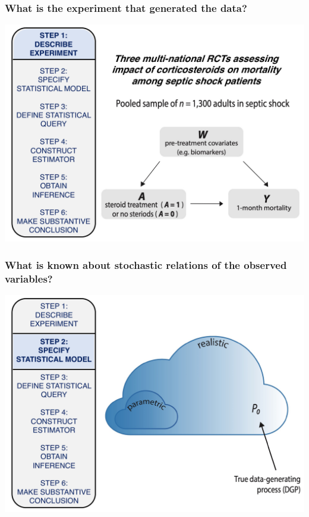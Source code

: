 \documentclass[t]{beamer}
\begin{document}
\begin{frame}
  \frametitle{What is the experiment that generated the data?}
  \vspace{-20pt}
  \begin{center}
  \includegraphics[width = 1.05\textwidth]{figures/roadmap1_2.pdf}
  \end{center}
\end{frame}


\begin{frame}
  \frametitle{What is known about stochastic relations of the observed variables?}
  \vspace{-20pt}
  \begin{center}
  \includegraphics[width = 1.05\textwidth]{figures/roadmap2.pdf}
  \end{center}
\end{frame}
\end{document}
